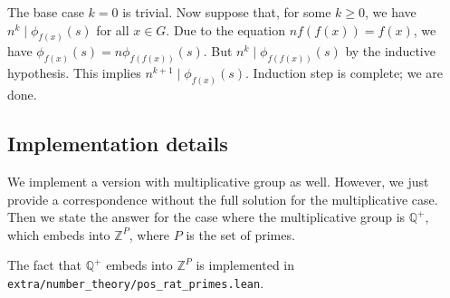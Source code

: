 \documentclass{article}
\newcommand{\Z}{\mathbb{Z}}
\newcommand{\Q}{\mathbb{Q}}
\begin{document}
The base case $k = 0$ is trivial.
Now suppose that, for some $k \geq 0$, we have $n^k \mid \phi_{f(x)}(s)$ for all $x \in G$.
Due to the equation $n f(f(x)) = f(x)$, we have $\phi_{f(x)}(s) = n \phi_{f(f(x))}(s)$.
But $n^k \mid \phi_{f(f(x))}(s)$ by the inductive hypothesis.
This implies $n^{k + 1} \mid \phi_{f(x)}(s)$.
Induction step is complete; we are done.



\subsection*{Implementation details}

We implement a version with multiplicative group as well.
However, we just provide a correspondence without the full solution for the multiplicative case.
Then we state the answer for the case where the multiplicative group is $\Q^+$, which embeds into $\Z^P$, where $P$ is the set of primes.

The fact that $\Q^+$ embeds into $\Z^P$ is implemented in \texttt{extra/number\_theory/pos\_rat\_primes.lean}.
\end{document}
